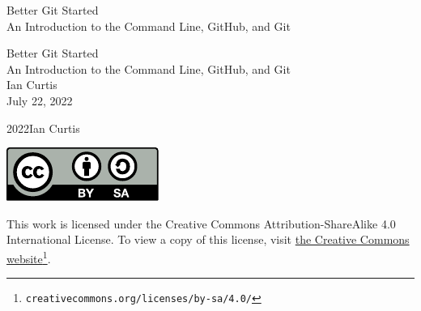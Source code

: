 \documentclass[oneside,10pt,]{book}
\newcommand{\titlepagefont}{\relax}
\begin{document}
\raggedbottom
\frontmatter
\thispagestyle{empty}
{\titlepagefont\centering
\vspace*{0.28\textheight}
{\Huge Better Git Started}\\[2\baselineskip]
{\LARGE An Introduction to the Command Line, GitHub, and Git}\\
}
\clearpage
\thispagestyle{empty}
{\titlepagefont\centering
\vspace*{0.14\textheight}
{\Huge Better Git Started}\\[\baselineskip]
{\LARGE An Introduction to the Command Line, GitHub, and Git}\\[3\baselineskip]
{\Large Ian Curtis}\\[3\baselineskip]
{\Large July 22, 2022}\\}
\clearpage
\thispagestyle{empty}
\hypertarget{g:colophon:idp614952488}{}
\noindent\textcopyright{}2022\quad{}Ian Curtis\\[0.5\baselineskip]
\begin{image}{0.4}{0.2}{0.4}%
\includegraphics[width=\linewidth]{external/cc_by_sa.pdf}
\end{image}%
 This work is licensed under the Creative Commons Attribution-ShareAlike 4.0 International License. To view a copy of this license, visit \href{http://creativecommons.org/licenses/by-sa/4.0/}{the Creative Commons website}\footnote{\nolinkurl{creativecommons.org/licenses/by-sa/4.0/}\label{g:fn:idp614958248}}.\par\medskip
{}
\null\clearpage
%
%
\typeout{************************************************}
\end{document}
